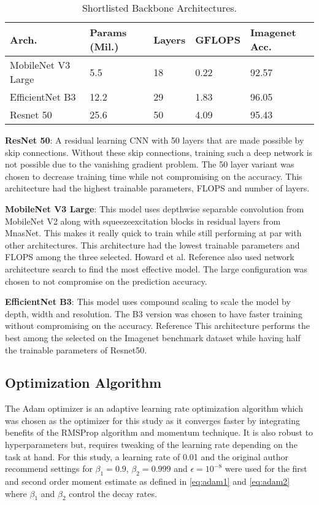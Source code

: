 \documentclass[conference]{IEEEtran}
\begin{document}
\begin{table}[htbp]
    \caption{Shortlisted Backbone Architectures.}
    \centering
    \begin{tabular}{p{1.5cm}|p{1cm}|p{1cm}|p{1.2cm}|p{1cm}}
    \hline
    Arch. & Params (Mil.) & Layers & GFLOPS & Imagenet Acc.\\
    \hline
    MobileNet V3 Large & 5.5 & 18 & 0.22 & 92.57\\
    \hline
    EfficientNet B3 & 12.2 & 29 & 1.83 & 96.05\\
    \hline
    Resnet 50 & 25.6 & 50 & 4.09 & 95.43\\
    \hline
    \end{tabular}
    \label{tab:selArch}
  \end{table}

\textbf{ResNet 50}: A residual learning CNN with 50 layers that  are made possible by skip connections. Without these skip  connections, training such a deep network is not possible due to the vanishing gradient problem. The 50 layer variant was chosen to decrease training time while not compromising on the accuracy. This architecture had the highest trainable parameters, FLOPS and number of layers\cite{b18}.

\textbf{MobileNet V3 Large}: This model uses depthwise separable convolution  from MobileNet V2 along with squeezeexcitation blocks in residual layers  from MnasNet. This makes it really quick to train while still performing at par with other architectures. This architecture had the lowest trainable parameters and FLOPS among the three selected. Howard et al. Reference\cite{b19} also used network architecture search to find the most effective model. The large configuration was chosen to not compromise on the prediction accuracy.

\textbf{EfficientNet B3}: This model uses compound scaling to scale the model by 
depth, width and resolution. The B3 version was chosen to have faster training without compromising on the accuracy. Reference\cite{b20} This architecture performs the 
best among the selected on the Imagenet benchmark dataset while having half  the trainable parameters of Resnet50.


\subsection{Optimization Algorithm}
The Adam optimizer \cite{b21} is an adaptive learning rate optimization algorithm which was chosen as the optimizer for this study as it converges faster by integrating benefits of the RMSProp algorithm and momentum technique. It is also robust to hyperparameters but, requires tweaking of the learning rate depending on the task at hand. For this study, a learning rate of 0.01 and the original author recommend settings for $\beta_{1} = 0.9$, $\beta_{2} = 0.999$ and $\epsilon = 10^{-8}$ were used for the first and second order moment estimate as defined in \eqref{eq:adam1} and \eqref{eq:adam2} where $\beta_{1}$ and 
$\beta_{2}$ control the decay rates.
\end{document}

